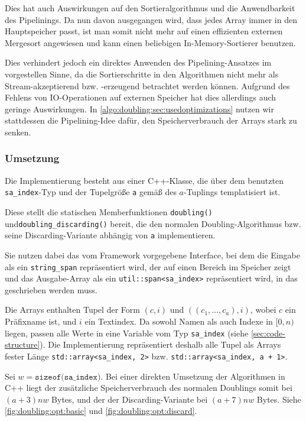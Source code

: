 Dies hat auch Auswirkungen auf den Sortieralgorithmus und die Anwendbarkeit des Pipelinings. Da nun davon ausgegangen wird, dass jedes Array immer in den Hauptspeicher passt, ist man somit nicht mehr auf einen effizienten externen Mergesort angewiesen und kann einen beliebigen In-Memory-Sortierer benutzen. 

Dies verhindert jedoch ein direktes Anwenden des Pipelining-Ansatzes im vorgestellen Sinne, da die Sortierschritte in den Algorithmen nicht mehr als Stream-akzeptierend bzw. -erzeugend betrachtet werden können. Aufgrund des Fehlens von IO-Operationen auf externen Speicher hat dies allerdings auch geringe Auswirkungen. In \cref{algo:doubling:sec:usedoptimizations} nutzen wir stattdessen die Pipelining-Idee dafür, den Speicherverbrauch der Arrays stark zu senken.

\subsubsection{Umsetzung}
\label{chapter:saca:doubling:memory}

Die Implementierung besteht aus einer C++-Klasse, die über dem benutzten \texttt{sa\_index}-Typ und der Tupelgröße \texttt{a} gemäß des $a$-Tuplings templatisiert ist.

Diese stellt die statischen Memberfunktionen \texttt{doubling()} und\linebreak \texttt{doubling\_discarding()} bereit, die den normalen Doubling-Algorithmus bzw. seine Discarding-Variante abhängig von \texttt{a} implementieren.

Sie nutzen dabei das vom Framework vorgegebene Interface, bei dem die Eingabe als ein \texttt{string\_span} repräsentiert wird, der auf einen Bereich im Speicher zeigt und das Ausgabe-Array \sa als ein \texttt{util::span<sa\_index>} repräsentiert wird, in das geschrieben werden muss.

Die Arrays enthalten Tupel der Form  $(c, i)$ und $((c_1, \dots, c_a), i)$, wobei $c$ ein Präfixname ist, und $i$ ein Textindex. Da sowohl Namen als auch Indexe in $[0, n)$ liegen, passen alle Werte in eine Variable vom Typ \texttt{sa\_index} (siehe \cref{sec:code-structure}). Die Implementierung repräsentiert deshalb alle Tupel als Arrays fester Länge \texttt{std::array<sa\_index, 2>} bzw. \texttt{std::array<sa\_index, a + 1>}.

Sei $w = \texttt{sizeof(sa\_index)}$. Bei einer direkten Umsetzung der Algorithmen in C++ liegt der zusätzliche Speicherverbrauch des normalen Doublings somit bei $(a + 3)nw$ Bytes, und der der Discarding-Variante bei $(a + 7)nw$ Bytes. Siehe \cref{fig:doubling:opt:basic} und \cref{fig:doubling:opt:discard}.

